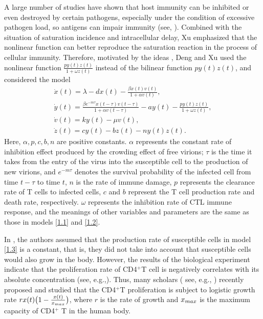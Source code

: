 \documentclass[10pt,a4paper]{amsart}
\numberwithin{equation}{section}
\begin{document}
A large number of studies have shown that host immunity can be inhibited or even 
destroyed by certain pathogens, especially under the condition of excessive pathogen 
load, so antigens can impair immunity
(see,  \cite{RW,WS}). Combined with the situation of saturation incidence and 
intracellular delay, Xu \cite{X}  emphasized that the nonlinear function can better
reproduce the saturation reaction in the process of cellular immunity. 
Therefore, motivated by the ideas \cite{HZ, LX, WL, WS},
Deng and Xu \cite{DX} used the nonlinear function $\frac{py(t)z(t)}{1+\omega z(t)}$ 
instead of the bilinear function $py(t)z(t)$, and considered the model
\begin{equation}\label{1.3}
\begin{gathered}
\dot{x}(t)=\lambda-dx(t)-{\frac{\beta x(t)v(t)}{1+\alpha v(t)}},\\
\dot{y}(t)={\frac{\beta e^{-m\tau}x(t-\tau)v(t-\tau)}{1+\alpha v(t-\tau)}}
-ay(t)-{\frac{py(t)z(t)}{1+\omega z(t)}},\\
\dot{v}(t)=ky(t)- \mu v(t),\\
\dot{z}(t)=cy(t)-bz(t)-ny(t)z(t).
\end{gathered}
\end{equation}
Here, $\alpha, p, c, b, n$ are positive constants. $\alpha$ represents the constant 
rate of inhibition effect produced by the crowding effect of free virions;
$\tau$ is the time it takes from the entry of the virus into the susceptible cell to 
the production of new virions, and $e^{-m\tau}$ denotes the survival
probability of the infected cell from time $t-\tau$ to time $t$, $n$ is the rate of 
immune damage, $p$ represents the clearance rate of T cells to infected cells,
$c$ and $b$ represent the T cell production rate and death rate, respectively. 
$\omega$ represents the inhibition rate of CTL
immune response, and the meanings of other variables and parameters are the same as 
those in models \eqref{1.1} and \eqref{1.2}.

In \cite{DX}, the authors assumed that the production rate of susceptible cells in model 
\eqref{1.3} is a constant, that is, they did not take into account that susceptible 
cells  would also grow in the body. However, the results of the biological experiment 
indicate that the proliferation rate of CD4$^+$T cell is negatively
correlates with its absolute concentration (see, e.g.,\cite{BR}). 
Thus, many  scholars ( see, e.g., \cite {LGM, LS, PC, WLL, ZZZ})  recently 
proposed and studied that the  CD4$^+$T  proliferation is subject to logistic growth 
rate $rx(t)\big(1-\frac{x(t)}{x_{\rm max}}\big)$,  where $r$ is the rate of growth and
$x_{\rm max}$ is the maximum capacity of CD4$^+$ T in the human body.
\end{document}
